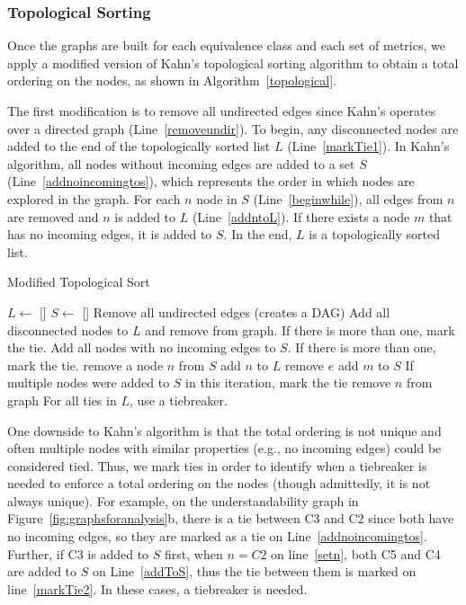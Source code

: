 \subsubsection{Topological Sorting}
Once the graphs are built for each equivalence class and each set of metrics, we apply a modified version of Kahn's topological sorting algorithm to obtain a total ordering on the nodes, as shown in Algorithm~\ref{topological}. 

The first modification is to remove all undirected edges since Kahn's operates over a directed graph (Line~\ref{removeundir}). To begin, any disconnected nodes are added to the end of the topologically sorted list $L$ (Line~\ref{markTie1}). 
In Kahn's algorithm, all nodes without incoming edges are added to a set $S$ (Line~\ref{addnoincomingtos}), which represents the order in which nodes are explored in the graph. For each $n$ node in $S$ (Line~\ref{beginwhile}), all edges from $n$ are removed and $n$ is added to $L$ (Line~\ref{addntoL}). If there exists a node $m$ that has no incoming edges, it is added to $S$.  In the end, $L$ is a topologically sorted list.

\begin{algorithm}
  \caption{Modified Topological Sort}\label{topological}
  \begin{algorithmic}[1]
\State  $L \gets$ []
\State $S \gets$ []
\State Remove all undirected edges (creates a DAG) \label{removeundir}
\State Add all disconnected nodes to $L$ and remove from graph. If there is more than one, mark the tie. \label{markTie1}
\State Add all nodes with no incoming edges to $S$. If there is more than one, mark the tie. \label{addnoincomingtos}
 \label{beginwhile}
	\State remove a node $n$ from $S$ \label{setn}
	\State add $n$ to $L$  \label{addntoL}
		\State remove $e$
			\State add $m$ to $S$ \label{addToS}
		\EndIf
	\EndFor
	\State If multiple nodes were added to $S$ in this iteration, mark the tie \label{markTie2}
	\State remove $n$ from graph
\EndWhile
\State For all ties in $L$, use a tiebreaker.
  \end{algorithmic}
\end{algorithm}

One downside to Kahn's algorithm is that the total ordering is not unique and often multiple nodes with similar properties (e.g., no incoming edges) could be considered tied. Thus, we mark ties in order to identify when a tiebreaker is needed to enforce a total ordering on the nodes (though admittedly, it is not always unique). For example, on the understandability graph in Figure~\ref{fig:graphsforanalysis}b, there is a tie between C3 and C2 since both have no incoming edges, so they are marked as a tie on Line~\ref{addnoincomingtos}. Further, if C3 is added to $S$ first, when $n=C2$ on line~\ref{setn}, both C5 and C4 are added to $S$ on Line~\ref{addToS}, thus the tie between them is marked on line~\ref{markTie2}. In these cases, a tiebreaker is needed.

